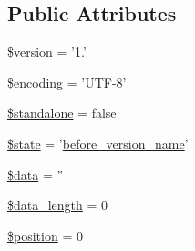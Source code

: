 \subsection*{Public Attributes}
\begin{DoxyCompactItemize}
\item 
\hyperlink{class_simple_pie___x_m_l___declaration___parser_aacea4010f8eb65de247d715381ccfdcf}{\$version} = '1.'
\item 
\hyperlink{class_simple_pie___x_m_l___declaration___parser_a4b82d110de3da615ab9279d6e2a51a76}{\$encoding} = 'U\-T\-F-\/8'
\item 
\hyperlink{class_simple_pie___x_m_l___declaration___parser_abdbb5ec56807a5845327efee783d0415}{\$standalone} = false
\item 
\hyperlink{class_simple_pie___x_m_l___declaration___parser_ade4aa70d388b976aa3598ebd0fcd7c40}{\$state} = '\hyperlink{class_simple_pie___x_m_l___declaration___parser_a78ff37588dfa85befef96ade2df22093}{before\-\_\-version\-\_\-name}'
\item 
\hyperlink{class_simple_pie___x_m_l___declaration___parser_a6f1f7a43a09e19b1149f52e0e11594cf}{\$data} = ''
\item 
\hyperlink{class_simple_pie___x_m_l___declaration___parser_ae19dd0cd809ba964d60ff2027833e51c}{\$data\-\_\-length} = 0
\item 
\hyperlink{class_simple_pie___x_m_l___declaration___parser_a3c1b2933aaeb5060bb6c2448567a8488}{\$position} = 0
\end{DoxyCompactItemize}



